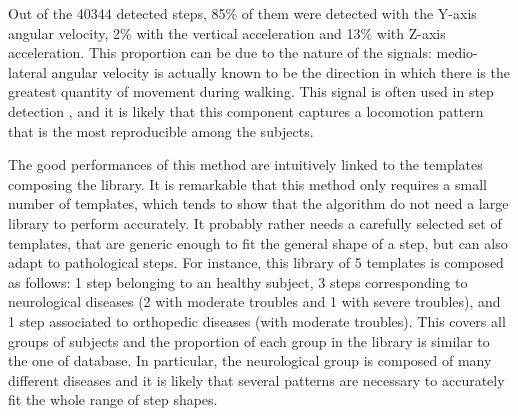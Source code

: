 \documentclass[../thesis.tex]{subfiles}
\begin{document}
Out of the 40344 detected steps, 85\% of them were detected with the Y-axis angular velocity, 2\% with the vertical acceleration and 13\% with Z-axis acceleration. This proportion can be due to the nature of the signals: medio-lateral angular velocity is actually known to be the direction in which there is the greatest quantity of movement during walking. This signal is often used in step detection \citep{salarian2004gait,ben2015comparison}, and it is likely that this component captures a locomotion pattern that is the most reproducible among the subjects.


The good performances of this method are intuitively linked to the templates composing the library. It is remarkable that this method only requires a small number of templates, which tends to show that the algorithm do not need a large library to perform accurately. It probably rather needs a carefully selected set of templates, that are generic enough to fit the general shape of a step, but can also adapt to pathological steps. For instance, this library of 5 templates is composed as follows: 1 step belonging to an healthy subject, 3 steps corresponding to neurological diseases (2 with moderate troubles and 1 with severe troubles), and 1 step associated to orthopedic diseases (with moderate troubles). This covers all groups of subjects and the proportion of each group in the library is similar to the one of database. In particular, the neurological group is composed of many different diseases and it is likely that several patterns are necessary to accurately fit the whole range of step shapes.

\end{document}
